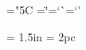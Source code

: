 {%
%
\def\registeredsymbol{%
  $^{{\ooalign{\hfil\raise.07ex\hbox{\selectfonts\lllsize R}%
               \hfil\crcr\Orb}}%
    }$%
}

%
\def\textdegree{$^\circ$}

%
\ifx\Orb\thisisundefined
\def\Orb{\mathhexbox20D}
\fi

\chardef\quotedblleft="5C
\chardef\quotedblright=`\"
\chardef\quoteleft=`\`
\chardef\quoteright=`\'



\newskip\titlepagetopglue \titlepagetopglue = 1.5in
\newskip\titlepagebottomglue \titlepagebottomglue = 2pc

\newif\ifseenauthor
\newif\iffinishedtitlepage

%
\newif\ifsetcontentsaftertitlepage
 \let\setcontentsaftertitlepage = \setcontentsaftertitlepagetrue
\newif\ifsetshortcontentsaftertitlepage
 \let\setshortcontentsaftertitlepage = \setshortcontentsaftertitlepagetrue

\parseargdef{}

\envdef\titlepage{%
  \begingroup
    \parindent=0pt \textfonts
    \vglue\titlepagetopglue
    \finishedtitlepagetrue
    \let\oldpage = \page
    \def\page{%
      \iffinishedtitlepage\else
	 \finishtitlepage
      \fi
      \let\page = \oldpage
      \page
      \null
    }%
}

\def\Etitlepage{%
    \iffinishedtitlepage\else
	\finishtitlepage
    \fi
    \oldpage
  \endgroup
  \HEADINGSon
  \ifsetshortcontentsaftertitlepage
    \shortcontents
    \contents
    \global\let\shortcontents = \relax
    \global\let\contents = \relax
  \fi
  \ifsetcontentsaftertitlepage
    \contents
    \global\let\contents = \relax
    \global\let\shortcontents = \relax
  \fi
}

}
